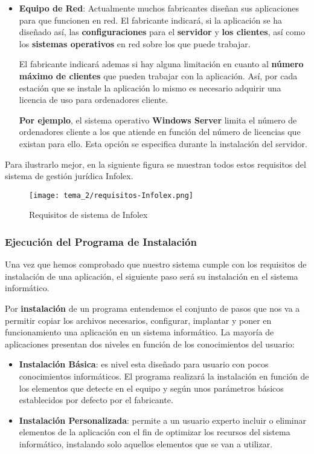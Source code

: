 \begin{itemize}
    \item \textbf{Equipo de Red}: Actualmente muchos fabricantes diseñan sus aplicaciones para que funcionen en red. El fabricante indicará, si la aplicación se ha diseñado así, las \textbf{configuraciones} para el \textbf{servidor} y \textbf{los clientes}, así como los \textbf{sistemas operativos} en red sobre los que puede trabajar.

    El fabricante indicará ademas si hay alguna limitación en cuanto al \textbf{número máximo de clientes} que pueden trabajar con la aplicación. Así, por cada estación que se instale la aplicación lo mismo es necesario adquirir una licencia de uso para ordenadores cliente.

    \textbf{Por ejemplo}, el sistema operativo \textbf{Windows Server} limita el número de ordenadores cliente a los que atiende en función del número de licencias que existan para ello. Esta opción se especifica durante la instalación del servidor.
\end{itemize}

Para ilustrarlo mejor, en la siguiente figura se muestran todos estos requisitos del sistema de gestión jurídica Infolex.

\begin{figure}[ht]
    \centering
    \texttt{[image: tema\_2/requisitos-Infolex.png]}
    \caption{Requisitos de sistema de Infolex}
\end{figure}

\subsubsection{Ejecución del Programa de Instalación}
Una vez que hemos comprobado que nuestro sistema cumple con los requisitos de instalación de una aplicación, el siguiente paso será su instalación en el sistema informático.

Por \textbf{instalación} de un programa entendemos el conjunto de pasos que nos va a permitir copiar los archivos necesarios, configurar, implantar y poner en funcionamiento una aplicación en un sistema informático. La mayoría de aplicaciones presentan dos niveles en función de los conocimientos del usuario:

\begin{itemize}
    \item \textbf{Instalación Básica}: es nivel esta diseñado para usuario con pocos conocimientos informáticos. El programa realizará la instalación en función de los elementos que detecte en el equipo y según unos parámetros básicos establecidos por defecto por el fabricante.

    \item \textbf{Instalación Personalizada}: permite a un usuario experto incluir o eliminar elementos de la aplicación con el fin de optimizar los recursos del sistema informático, instalando solo aquellos elementos que se van a utilizar.
\end{itemize}

